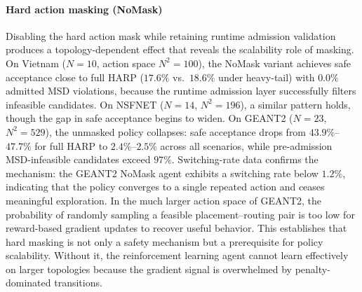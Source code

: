 \documentclass[final,5p]{elsarticle}
\begin{document}
\paragraph{Hard action masking (NoMask)}
Disabling the hard action mask while retaining runtime admission validation produces a topology-dependent effect that reveals the scalability role of masking. On Vietnam (\(N{=}10\), action space \(N^2{=}100\)), the NoMask variant achieves safe acceptance close to full HARP (\(17.6\%\) vs.\ \(18.6\%\) under heavy-tail) with \(0.0\%\) admitted MSD violations, because the runtime admission layer successfully filters infeasible candidates. On NSFNET (\(N{=}14\), \(N^2{=}196\)), a similar pattern holds, though the gap in safe acceptance begins to widen. On GEANT2 (\(N{=}23\), \(N^2{=}529\)), the unmasked policy collapses: safe acceptance drops from \(43.9\%\)--\(47.7\%\) for full HARP to \(2.4\%\)--\(2.5\%\) across all scenarios, while pre-admission MSD-infeasible candidates exceed \(97\%\). Switching-rate data confirms the mechanism: the GEANT2 NoMask agent exhibits a switching rate below \(1.2\%\), indicating that the policy converges to a single repeated action and ceases meaningful exploration. In the much larger action space of GEANT2, the probability of randomly sampling a feasible placement--routing pair is too low for reward-based gradient updates to recover useful behavior. This establishes that hard masking is not only a safety mechanism but a prerequisite for policy scalability. Without it, the reinforcement learning agent cannot learn effectively on larger topologies because the gradient signal is overwhelmed by penalty-dominated transitions.
\end{document}
